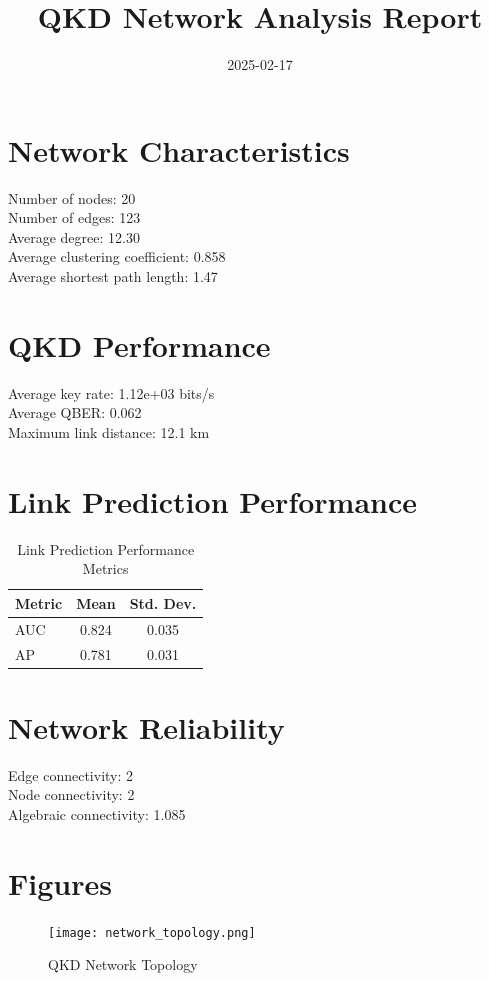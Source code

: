\documentclass{article}
\title{QKD Network Analysis Report}
\date{2025-02-17}
\begin{document}
    \maketitle

    \section{Network Characteristics}
    Number of nodes: 20 \\
    Number of edges: 123 \\
    Average degree: 12.30 \\
    Average clustering coefficient: 0.858 \\
    Average shortest path length: 1.47

    \section{QKD Performance}
    Average key rate: 1.12e+03 bits/s \\
    Average QBER: 0.062 \\
    Maximum link distance: 12.1 km

    \section{Link Prediction Performance}
    \begin{table}[H]
    \centering
    \begin{tabular}{lcc}
    \toprule
    Metric & Mean & Std. Dev. \\
    \midrule
    AUC & 0.824 &
        0.035 \\
    AP & 0.781 &
        0.031 \\
    \bottomrule
    \end{tabular}
    \caption{Link Prediction Performance Metrics}
    \end{table}

    \section{Network Reliability}
    Edge connectivity: 2 \\
    Node connectivity: 2 \\
    Algebraic connectivity: 1.085

    \section{Figures}
    \begin{figure}[H]
    \centering
    \texttt{[image: network\_topology.png]}
    \caption{QKD Network Topology}
    \end{figure}
\end{document}
